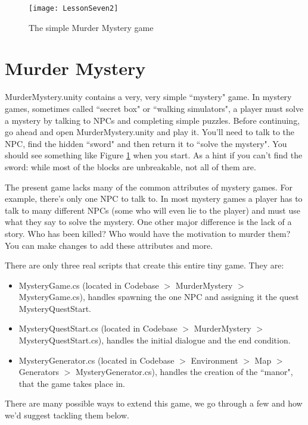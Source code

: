 \documentclass{article}
\begin{document}
 \begin{figure}
  \texttt{[image: LessonSeven2]}
  \caption{The simple Murder Mystery game}
  \label{fig:mystery}
\end{figure}

\section{Murder Mystery}

MurderMystery.unity contains a very, very simple ``mystery" game. In mystery games, sometimes called ``secret box" or ``walking simulators", a player must solve a mystery by talking to NPCs and completing simple puzzles. Before continuing, go ahead and open MurderMystery.unity and play it. You'll need to talk to the NPC, find the hidden ``sword" and then return it to ``solve the mystery". You should see something like Figure \ref{fig:mystery} when you start. As a hint if you can't find the sword: while most of the blocks are unbreakable, not all of them are.

The present game lacks many of the common attributes of mystery games. For example, there's only one NPC to talk to. In most mystery games a player has to talk to many different NPCs (some who will even lie to the player) and must use what they say to solve the mystery.  One other major difference is the lack of a story. Who has been killed? Who would have the motivation to murder them? You can make changes to add these attributes and more.

There are only three real scripts that create this entire tiny game. They are: 
\begin{itemize}
\item MysteryGame.cs (located in Codebase $>$ MurderMystery $>$ MysteryGame.cs), handles spawning the one NPC and assigning it the quest MysteryQuestStart.
\item MysteryQuestStart.cs (located in Codebase $>$ MurderMystery $>$ MysteryQuestStart.cs), handles the initial dialogue and the end condition.
\item MysteryGenerator.cs (located in Codebase $>$ Environment $>$ Map $>$ Generators $>$ MysteryGenerator.cs), handles the creation of the ``manor", that the game takes place in.
\end{itemize}

There are many possible ways to extend this game, we go through a few and how we'd suggest tackling them below. 
\end{document}
